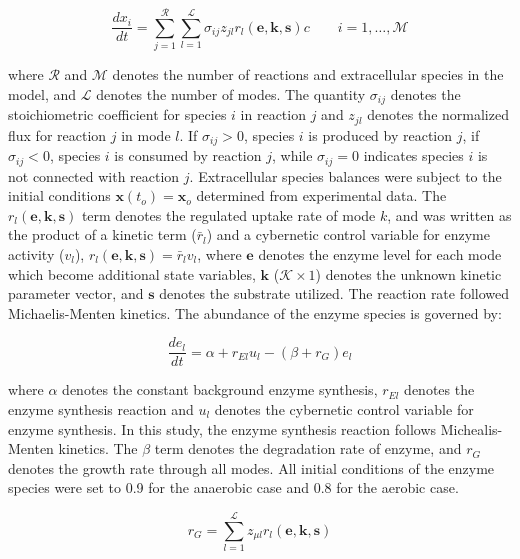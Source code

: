 \documentclass[10pt,twocolumn,twoside,final]{IEEEtran}
\begin{document}
\begin{equation}
	\frac{dx_{i}}{dt}  =  \sum_{j = 1}^{\mathcal{R}}\sum_{l = 1}^{\mathcal{L}}\sigma_{ij}z_{jl}r_{l}\left(\mathbf{e},\mathbf{k},\mathbf{s}\right)c \qquad{i=1,\hdots,\mathcal{M}} 
\end{equation}

where $\mathcal{R}$ and $\mathcal{M}$ denotes the number of reactions and extracellular species in the model, and $\mathcal{L}$ denotes the number of modes.
The quantity $\sigma_{ij}$ denotes the stoichiometric coefficient for species $i$ in reaction $j$ and
$z_{jl}$ denotes the normalized flux for reaction $j$ in mode $l$.
If $\sigma_{ij}>0$, species $i$ is produced by reaction $j$, if $\sigma_{ij}<0$, species $i$ is consumed by reaction $j$, while $\sigma_{ij} = 0$ indicates species $i$ is not connected with reaction $j$.
Extracellular species balances were subject to the initial conditions $\mathbf{x}\left(t_{o}\right) = \mathbf{x}_{o}$ determined from experimental data.
The $r_{l}\left(\mathbf{e},\mathbf{k},\mathbf{s}\right)$ term denotes the regulated uptake rate of mode $k$, and was written as the product of a kinetic term ($\bar{r}_{l}$) and a cybernetic control variable for enzyme activity ($v_{l}$), $r_{l}\left(\mathbf{e},\mathbf{k},\mathbf{s}\right) = \bar{r}_{l}v_{l}$, where $\mathbf{e}$ denotes the enzyme level for each mode which become additional state variables, $\mathbf{k}$ ($\mathcal{K}\times{1}$) denotes the unknown kinetic parameter vector, and $\mathbf{s}$ denotes the substrate utilized. The reaction rate followed Michaelis-Menten kinetics. The abundance of the enzyme species is governed by:
 
\begin{equation}
	\frac{de_{l}}{dt}  = \alpha + r_{El}u_{l} - \left(\beta+r_{G}\right)e_{l}
\end{equation}

where $\alpha$ denotes the constant background enzyme synthesis, $r_{El}$ denotes the enzyme synthesis reaction and $u_{l}$ denotes the cybernetic control variable for enzyme synthesis. In this study, the enzyme synthesis reaction follows Michealis-Menten kinetics. The $\beta$ term denotes the degradation rate of enzyme, and $r_{G}$ denotes the growth rate through all modes. All initial conditions of the enzyme species were set to 0.9 for the anaerobic case and 0.8 for the aerobic case. 

\begin{equation}
	r_{G}  = \sum_{l = 1}^{\mathcal{L}}z_{\mu l}r_{l}\left(\mathbf{e},\mathbf{k},\mathbf{s}\right)
\end{equation}
\end{document}
